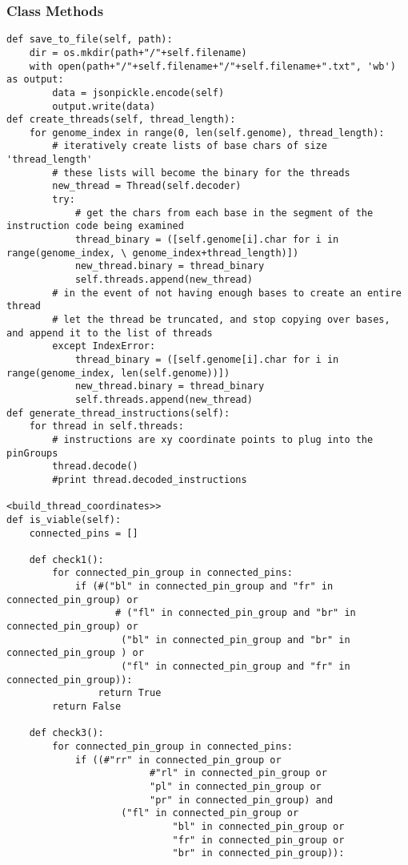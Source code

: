 \documentclass[a4paper]{article}
\begin{document}
\subsubsection{Class Methods}
\label{sec-7-3-1}

\begin{verbatim}
def save_to_file(self, path):
    dir = os.mkdir(path+"/"+self.filename)
    with open(path+"/"+self.filename+"/"+self.filename+".txt", 'wb') as output:
        data = jsonpickle.encode(self)
        output.write(data)
def create_threads(self, thread_length):
    for genome_index in range(0, len(self.genome), thread_length):
        # iteratively create lists of base chars of size 'thread_length'
        # these lists will become the binary for the threads
        new_thread = Thread(self.decoder)
        try:
            # get the chars from each base in the segment of the instruction code being examined
            thread_binary = ([self.genome[i].char for i in range(genome_index, \ genome_index+thread_length)])
            new_thread.binary = thread_binary
            self.threads.append(new_thread)
        # in the event of not having enough bases to create an entire thread
        # let the thread be truncated, and stop copying over bases, and append it to the list of threads
        except IndexError:
            thread_binary = ([self.genome[i].char for i in range(genome_index, len(self.genome))])
            new_thread.binary = thread_binary
            self.threads.append(new_thread)
def generate_thread_instructions(self):
    for thread in self.threads:
        # instructions are xy coordinate points to plug into the pinGroups
        thread.decode()
        #print thread.decoded_instructions

<build_thread_coordinates>>
def is_viable(self):
    connected_pins = []

    def check1():
        for connected_pin_group in connected_pins:
            if (#("bl" in connected_pin_group and "fr" in connected_pin_group) or
                   # ("fl" in connected_pin_group and "br" in connected_pin_group) or
                    ("bl" in connected_pin_group and "br" in connected_pin_group ) or
                    ("fl" in connected_pin_group and "fr" in connected_pin_group)):
                return True
        return False

    def check3():
        for connected_pin_group in connected_pins:
            if ((#"rr" in connected_pin_group or
                         #"rl" in connected_pin_group or
                         "pl" in connected_pin_group or
                         "pr" in connected_pin_group) and
                    ("fl" in connected_pin_group or
                             "bl" in connected_pin_group or
                             "fr" in connected_pin_group or
                             "br" in connected_pin_group)):


\end{verbatim}
\end{document}
